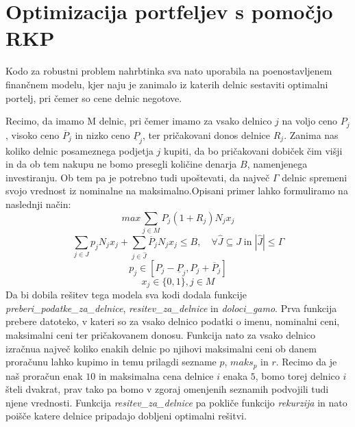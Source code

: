 \documentclass[a4paper,12pt]{article}
\theoremstyle{definition}
\begin{document}
\section{Optimizacija portfeljev s pomočjo RKP}
Kodo za robustni problem nahrbtinka sva nato uporabila na poenostavljenem finančnem modelu,
kjer naju je zanimalo iz katerih delnic sestaviti optimalni portelj, pri čemer so cene delnic
negotove. 
\par
Recimo, da imamo M delnic, pri čemer imamo za vsako delnico $j$ na voljo ceno $P_j$, visoko ceno 
$\overline{P}_{j}$ in nizko ceno $\underline{P}_{j}$, ter pričakovani donos delnice $R_j$. Zanima 
nas koliko delnic posameznega podjetja $j$ kupiti, da bo pričakovani dobiček čim višji in da ob tem nakupu
ne bomo presegli količine denarja $B$, namenjenega investiranju. Ob tem pa je potrebno tudi upoštevati,
da največ $\Gamma$ delnic spremeni svojo vrednost iz nominalne na maksimalno.Opisani primer lahko
formuliramo na naslednji način:
\begin{equation}
\tag*{}
     max \sum_{j \in M} P_{j}(1 + R_{j})N_{j}x_{j}
\end{equation}
\begin{equation}
\tag*{}
    \sum_{j \in J}p_{j}N_{j}x_{j} + \sum_{j \in \hat{J}}\overline{P}_{j}N_{j}x_{j} \leq B,\quad \forall \hat{J} \subseteq J \; \text{in}\; |\hat{J}| \leq \Gamma    
\end{equation}
\begin{equation}
\tag*{}
    p_{j} \in [P_{j} - \underline{P}_{j}, P_{j} + \overline{P}_{j}]
\end{equation}
\begin{equation}
\tag*{}
    x_{j} \in \{0,1\}, j \in M
\end{equation}
Da bi dobila rešitev tega modela sva kodi dodala
funkcije \textit{preberi\_podatke\_za\_delnice},
\textit{resitev\_za\_delnice} in \textit{doloci\_gamo}. Prva funkcija prebere
datoteko, v kateri so za vsako delnico podatki o imenu,
nominalni ceni, maksimalni ceni ter pričakovanem donosu.
Funkcija nato za vsako delnico izračnua največ koliko enakih
delnic po njihovi maksimalni ceni ob danem proračunu lahko kupimo in temu prilagdi sezname $p$,
$maks_p$ in $r$. Recimo da je naš proračun enak $10$ in maksimalna cena delnice $i$ enaka
$5$, bomo torej delnico $i$ šteli dvakrat, prav tako pa bomo v zgoraj omenjenih seznamih
podvojili tudi njene vrednosti. Funkcija \textit{resitev\_za\_delnice} pa pokliče funkcijo \textit{rekurzija}
in nato poišče katere delnice pripadajo dobljeni optimalni rešitvi.
\par
\end{document}
